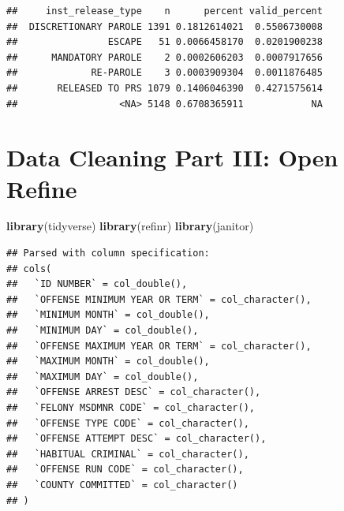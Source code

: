 \documentclass[]{book}
\newenvironment{Shaded}{\begin{snugshade}}{\end{snugshade}}
\newcommand{\KeywordTok}[1]{\textcolor[rgb]{0.13,0.29,0.53}{\textbf{#1}}}
\newcommand{\NormalTok}[1]{#1}
\newcommand{\OperatorTok}[1]{\textcolor[rgb]{0.81,0.36,0.00}{\textbf{#1}}}
\newcommand{\StringTok}[1]{\textcolor[rgb]{0.31,0.60,0.02}{#1}}
\begin{document}
\begin{Shaded}
\end{Shaded}

\begin{verbatim}
##     inst_release_type    n      percent valid_percent
##  DISCRETIONARY PAROLE 1391 0.1812614021  0.5506730008
##                ESCAPE   51 0.0066458170  0.0201900238
##      MANDATORY PAROLE    2 0.0002606203  0.0007917656
##             RE-PAROLE    3 0.0003909304  0.0011876485
##       RELEASED TO PRS 1079 0.1406046390  0.4271575614
##                  <NA> 5148 0.6708365911            NA
\end{verbatim}

\hypertarget{data-cleaning-part-iii-open-refine}{%
\chapter{Data Cleaning Part III: Open Refine}\label{data-cleaning-part-iii-open-refine}}

\begin{Shaded}
\begin{Highlighting}[]
\KeywordTok{library}\NormalTok{(tidyverse)}
\KeywordTok{library}\NormalTok{(refinr)}
\KeywordTok{library}\NormalTok{(janitor)}
\end{Highlighting}
\end{Shaded}

\begin{Shaded}
\end{Shaded}

\begin{verbatim}
## Parsed with column specification:
## cols(
##   `ID NUMBER` = col_double(),
##   `OFFENSE MINIMUM YEAR OR TERM` = col_character(),
##   `MINIMUM MONTH` = col_double(),
##   `MINIMUM DAY` = col_double(),
##   `OFFENSE MAXIMUM YEAR OR TERM` = col_character(),
##   `MAXIMUM MONTH` = col_double(),
##   `MAXIMUM DAY` = col_double(),
##   `OFFENSE ARREST DESC` = col_character(),
##   `FELONY MSDMNR CODE` = col_character(),
##   `OFFENSE TYPE CODE` = col_character(),
##   `OFFENSE ATTEMPT DESC` = col_character(),
##   `HABITUAL CRIMINAL` = col_character(),
##   `OFFENSE RUN CODE` = col_character(),
##   `COUNTY COMMITTED` = col_character()
## )
\end{verbatim}
\end{document}
